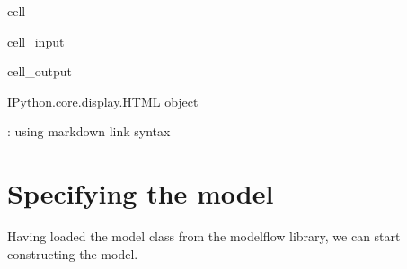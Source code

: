 \documentclass[letterpaper,10pt,english]{jupyterBook}
\begin{document}
\begin{sphinxuseclass}{cell}\begin{sphinxVerbatimInput}

\begin{sphinxuseclass}{cell_input}
\begin{sphinxVerbatim}[commandchars=\\\{\}]
   

   
   

   
\end{sphinxVerbatim}

\end{sphinxuseclass}\end{sphinxVerbatimInput}
\begin{sphinxVerbatimOutput}

\begin{sphinxuseclass}{cell_output}
\begin{sphinxVerbatim}[commandchars=\\\{\}]
\PYGZlt{}IPython.core.display.HTML object\PYGZgt{}
\end{sphinxVerbatim}

\end{sphinxuseclass}\end{sphinxVerbatimOutput}

\end{sphinxuseclass}
\ignorespaces 
\sphinxAtStartPar
{}: using markdown link syntax

\ignorespaces 

\section{Specifying the model}
\label{\detokenize{content/03_Installation/TestingModelFlow:specifying-the-model}}\label{\detokenize{content/03_Installation/TestingModelFlow:index-1}}
\sphinxAtStartPar
Having loaded the model class from the modelflow library, we can start constructing the model.
\end{document}
